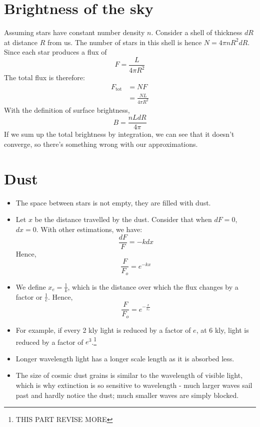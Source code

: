 \documentclass{article}
\begin{document}
\section{Brightness of the sky}
Assuming stars have constant number density $n$. Consider a shell of thickness $dR$ at distance $R$ from us. The number of stars in this shell is hence $N= 4\pi n  R^2 dR$. Since each star produces a flux of  
\begin{equation}
F=\frac{L}{4\pi R^2}
\end{equation}
The total flux is therefore:
\begin{align}
F_\text{tot}&=NF\\
&=\frac{NL}{4\pi R^2}
\end{align}
With the definition of surface brightness, 
\begin{equation}
B=\frac{nLdR}{4 \pi}
\end{equation}
If we sum up the total brightness by integration, we can see that it doesn't converge, so there's something wrong with our approximations.
\section{Dust}
\begin{itemize}
\item The space between stars is not empty, they are filled with dust.
\item Let $x$ be the distance travelled by the dust. Consider that when $dF=0$, $dx=0$. With other estimations, we have:
\begin{equation}
\frac{dF}{F}=-kdx
\end{equation}
Hence,
\begin{equation}
\frac{F}{F_o}=e^{-kx}
\end{equation}
\item We define $x_e=\frac{1}{k}$, which is the distance over which the flux changes by a factor or $\frac{1}{e}$.
Hence, 
\begin{equation}
\frac{F}{F_o}=e^{-\frac{x}{x_e}}
\end{equation}

\item For example, if every 2 kly light is reduced by a factor of $e$, at 6 kly, light is reduced by a factor of $e^3$.\footnote{THIS PART REVISE MORE}
\item Longer wavelength light has a longer scale length as it is absorbed less.
\item The size of cosmic dust grains is similar to the wavelength of visible light, which is why extinction is so sensitive to wavelength - much larger waves sail past and hardly notice
the dust; much smaller waves are simply blocked.
\end{itemize}
\end{document}
